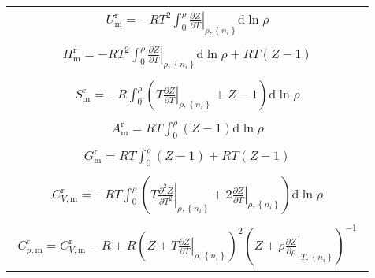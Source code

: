 \documentclass[main.tex]{subfiles}
\begin{document}
\begin{longtable}{m{}}
  \begin{align}U_\text{m}^\text{r}      =-RT^2\int_0^\rho\left.\frac{\partial Z}{\partial T}\right|_{\rho,\left\{n_i\right\}}\mathrm{d}\ln \rho\end{align}                                                                                                        \\[-8ex]
  \begin{align}H_\text{m}^\text{r}      =-RT^2\int_0^\rho\left.\frac{\partial Z}{\partial T}\right|_{\rho,\left\{n_i\right\}}\mathrm{d}\ln\rho+RT\left(Z-1\right)\end{align}                                                                                      \\[-8ex]
  \begin{align}S_\text{m}^\text{r}      =-R\int_0^\rho\left(T\left.\frac{\partial Z}{\partial T}\right|_{\rho,\left\{n_i\right\}}+Z-1\right)\mathrm{d}\ln\rho\end{align}                                                                                          \\[-8ex]
  \begin{align}A_\text{m}^\text{r}      =RT\int_0^\rho\left(Z-1\right)\mathrm{d}\ln\rho\end{align}                                                                                                                                                                \\[-8ex]
  \begin{align}G_\text{m}^\text{r}      =RT\int_0^\rho\left(Z-1\right)+RT\left(Z-1\right)\end{align}                                                                                                                                                              \\[-8ex]
  \begin{align}C_{V,\text{m}}^\text{r}  =-RT\int_0^\rho\left(T\left.\frac{\partial^2 Z}{\partial T^2}\right|_{\rho,\left\{n_i\right\}}+2\left.\frac{\partial Z}{\partial T}\right|_{\rho,\left\{n_i\right\}}\right)\mathrm{d}\ln\rho\end{align}                   \\[-8ex]
  \begin{align}C_{p,\text{m}}^\text{r}  =C_{V,\text{m}}^\text{r}-R+R\left(Z+T\left.\frac{\partial Z}{\partial T}\right|_{\rho,\left\{n_i\right\}}\right)^2\left(Z+\rho\left.\frac{\partial Z}{\partial \rho}\right|_{T,\left\{n_i\right\}}\right)^{-1}\end{align} \\
  \hline
\end{longtable}
\end{document}
